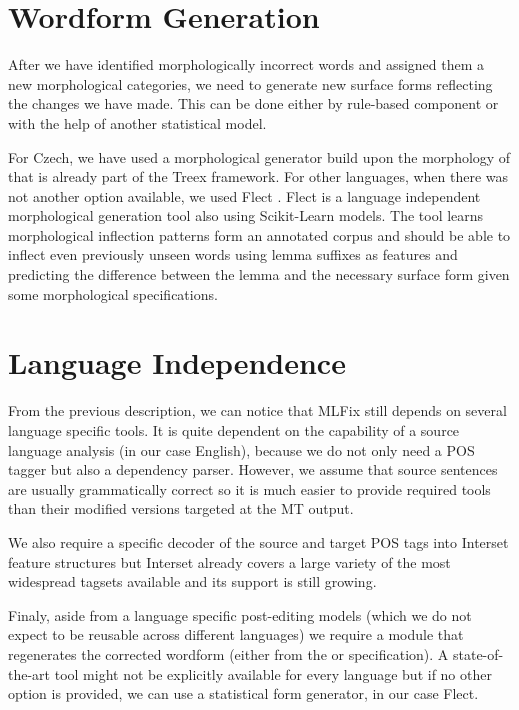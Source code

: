 \section{Wordform Generation}

After we have identified morphologically incorrect words and assigned
them a new morphological categories, we need to generate new surface forms reflecting
the changes we have made.
This can be done either by rule-based component or with
the help of another statistical model. 

For Czech, we have used a morphological generator build upon the morphology of \citet{HajicHAB2004}
that is already part of the Treex framework. For other languages,
when there was not another option available,
we used Flect \citep{DBLP:conf/acl/DusekJ13}.
Flect is a language independent morphological generation tool also using Scikit-Learn
models. The tool learns morphological inflection patterns form an annotated corpus and
should be able to inflect even previously unseen words using lemma suffixes as features
and predicting the difference between the lemma and the necessary surface form given some
morphological specifications.

\section{Language Independence}

From the previous description, we can notice that MLFix still depends on several
language specific tools. It is quite dependent on the capability of a source
language analysis (in our case English), because we do not only need a POS tagger but also a dependency
parser. However, we assume that source sentences are usually grammatically correct
so it is much easier to provide required tools than their modified versions
targeted at the MT output.

We also require a specific decoder of the source and target POS tags into Interset feature
structures but Interset already covers a large variety of the most widespread tagsets available
and its support is still growing.

Finaly, aside from a language specific post-editing models (which we do not expect
to be reusable across different languages) we require a module that regenerates
the corrected wordform (either from the  or  specification).
A state-of-the-art tool might not be explicitly available for every language but if no
other option is provided, we can use a statistical form generator, in our case Flect.
